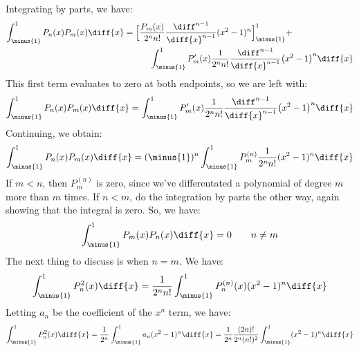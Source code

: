         Integrating by parts, we have:
        \begin{equation}
            \begin{split}
                \int_{\minus{1}}^{1}P_{n}(x)P_{m}(x)\diff{x}&=
                    \Big[\frac{P_{m}(x)}{2^{n}n!}
                    \frac{\diff^{n-1}}{\diff{x}^{n-1}}(x^{2}-1)^{n}
                    \Big]_{\minus{1}}^{1}+\\
                    &\quad\quad\quad
                    \int_{\minus{1}}^{1}P_{m}'(x)\frac{1}{2^{n}n!}
                    \frac{\diff^{n-1}}{\diff{x}^{n-1}}
                    \big(x^{2}-1\big)^{n}\diff{x}
                \end{split}
        \end{equation}
        This first term evaluates to zero at both endpoints,
        so we are left with:
        \begin{equation}
            \int_{\minus{1}}^{1}P_{n}(x)P_{m}(x)\diff{x}=
                \int_{\minus{1}}^{1}P_{m}'(x)\frac{1}{2^{n}n!}
                \frac{\diff^{n-1}}{\diff{x}^{n-1}}
                \big(x^{2}-1\big)^{n}\diff{x}
        \end{equation}
        Continuing, we obtain:
        \begin{equation}
            \int_{\minus{1}}^{1}P_{n}(x)P_{m}(x)\diff{x}=
            (\minus{1})^{n}\int_{\minus{1}}^{1}
                P_{m}^{(n)}\frac{1}{2^{n}n!}(x^{2}-1)^{n}
                    \diff{x}
        \end{equation}
        If $m<n$, then $P_{m}^{(n)}$ is zero, since we've
        differentated a polynomial of degree $m$ more than
        $m$ times. If $n<m$, do the integration by parts the
        other way, again showing that the integral is zero.
        So, we have:
        \begin{equation}
            \int_{\minus{1}}^{1}P_{m}(x)P_{n}(x)\diff{x}=0
            \quad\quad
            n\ne{m}
        \end{equation}
        The next thing to discuss is when $n=m$. We have:
        \begin{equation}
            \int_{\minus{1}}^{1}P_{n}^{2}(x)\diff{x}=
            \frac{1}{2^{n}n!}\int_{\minus{1}}^{1}
                P_{n}^{(n)}(x)(x^{2}-1)^{n}\diff{x}
        \end{equation}
        Letting $a_{n}$ be the coefficient of the $x^{n}$ term,
        we have:
        \begin{equation}
            \int_{\minus{1}}^{1}P_{n}^{2}(x)\diff{x}=
            \frac{1}{2^{n}}\int_{\minus{1}}^{1}a_{n}(x^{2}-1)^{n}
                \diff{x}
            =\frac{1}{2^{n}}\frac{(2n)!}{2^{n}(n!)^{2}}
                \int_{\minus{1}}^{1}(x^{2}-1)^{n}\diff{x}
        \end{equation}
